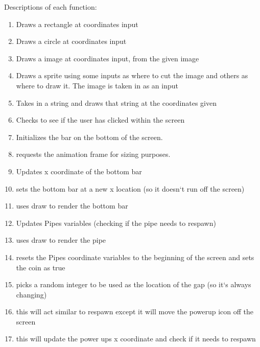\documentclass[11pt, oneside]{article}   	%
\begin{document}
Descriptions of each function:
\begin{enumerate}
\item  Draws a rectangle at coordinates input

\item  Draws a circle at coordinates input

\item  Draws a image at coordinates input, from the given image

\item  Draws a sprite using some inputs as where to cut the image and others as where to draw it. The image is taken in as an input

\item  Takes in a string and draws that string at the coordinates given

\item Checks to see if the user has clicked within the screen

\item Initializes the bar on the bottom of the screen.

\item requests the animation frame for sizing purposes.

\item Updates x coordinate of the bottom bar

\item sets the bottom bar at a new x location (so it doesn`t run off the screen)

\item uses draw to render the bottom bar 

\item Updates Pipes variables (checking if the pipe needs to respawn)

\item uses draw to render the pipe

\item resets the Pipes coordinate variables to the beginning of the screen and sets the coin as true

\item  picks a random integer to be used as the location of the gap (so it`s always changing)

\item this will act similar to respawn except it will move the powerup icon off the screen 

\item this will update the power ups x coordinate and check if it needs to respawn


\end{enumerate}
\end{document}

